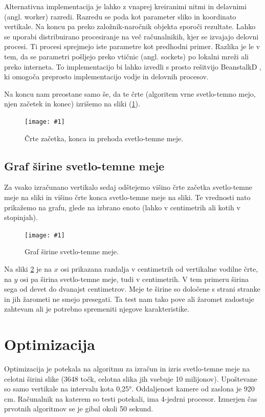 \documentclass[oneside, a4paper, 12pt]{book}
\newcommand{\slika}[3]{
	\begin{figure}
	\begin{center}
	\texttt{[image: \#1]}
	\end{center}
	\vspace{-20pt}
	\caption{#2}
	\label{#3}
	\end{figure}
}
\begin{document}
Alternativna implementacija je lahko z vnaprej kreiranimi nitmi in 
delavnimi (angl. worker) razredi. Razredu se poda kot parameter sliko 
in koordinato vertikale. Na koncu pa preko založnik-naročnik objekta 
sporoči rezultate. Lahko se uporabi distribuirano procesiranje na več 
računalnikih, kjer se izvajajo delovni procesi. Ti procesi sprejmejo 
iste parametre kot predhodni primer. Razlika je le v tem, da se 
parametri pošljejo preko vtičnic (angl. sockets) po lokalni mreži 
ali preko interneta. To implementacijo bi lahko izvedli s prosto 
rešitvijo BeanstalkD \cite{beanstalkd}, ki omogoča preprosto 
implementacijo vodje in delovnih procesov.

Na koncu nam preostane samo še, da te črte (algoritem vrne svetlo-temno 
mejo, njen začetek in konec) izrišemo na sliki (\ref{pic:svet-tem3}). 



\slika{slike/svetlo-temna-meja-po-celi-sirini.jpg}{Črte začetka, 
konca in prehoda svetlo-temne meje.}{pic:svet-tem3}

\subsection{Graf širine svetlo-temne meje}
Za vsako izračunano vertikalo sedaj odštejemo višino črte začetka 
svetlo-temne meje na sliki in višino črte konca svetlo-temne meje 
na sliki. Te vrednosti nato prikažemo na grafu, glede na izbrano 
enoto (lahko v centimetrih ali kotih v stopinjah).

\slika{slike/graf-sirina-s-t-meja-crop.jpg}
{Graf širine svetlo-temne meje.}{pic:st-sirina}


Na sliki \ref{pic:st-sirina} je na $x$ osi prikazana razdalja v 
centimetrih od vertikalne vodilne črte, na $y$ osi pa širina 
svetlo-temne meje, tudi v centimetrih. V tem primeru širina sega 
od devet do dvanajst centimetrov. Meje te širine so določene s 
strani stranke in jih žarometi ne smejo presegati. Ta test nam 
tako pove ali žaromet zadostuje zahtevam ali je potrebno spremeniti 
njegove karakteristike.


\section{Optimizacija}
Optimizacija je potekala na algoritmu za izračun in izris 
svetlo-temne meje na celotni širini slike (3648 točk, celotna 
slika jih vsebuje 10 milijonov). Upoštevane so samo vertikale na 
intervalu kota 0,25°. Oddaljenost kamere od zaslona je 920 cm. 
Računalnik na katerem so testi potekali, ima 4-jedrni procesor. 
Izmerjen čas prvotnih algoritmov se je gibal okoli 50 sekund.
\end{document}
